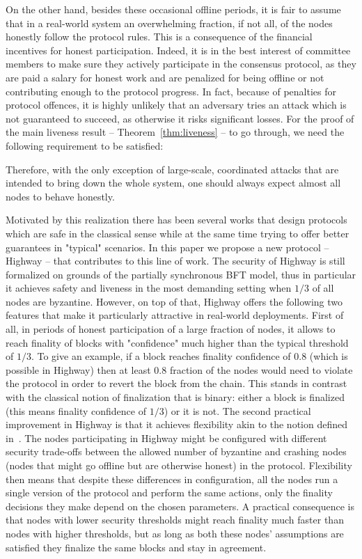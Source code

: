 \documentclass[12pt, fleqn]{article}
\begin{document}
On the other hand, besides these occasional offline periods, it is fair to assume that in a real-world system an overwhelming fraction, if not all, of the nodes honestly follow the protocol rules.
%
This is a consequence of the financial incentives for honest participation.
%
Indeed, it is in the best interest of committee members to make sure they actively participate in the consensus protocol, as they are paid a salary for honest work and are penalized for being offline or not contributing enough to the protocol progress.
%
In fact, because of penalties for protocol offences, it is highly unlikely that an adversary tries an attack which is not guaranteed to succeed, as otherwise it risks significant losses.
For the proof of the main liveness result -- Theorem~\ref{thm:liveness} -- to go through, we need the following requirement to be satisfied: 

%
Therefore, with the only exception of large-scale, coordinated attacks that are intended to bring down the whole system, one should always expect almost all nodes to behave honestly.

Motivated by this realization there has been several works that design protocols which are safe in the classical sense while at the same time trying to offer better guarantees in "typical" scenarios.
%
In this paper we propose a new protocol -- Highway -- that contributes to this line of work.
%
The security of Highway is still formalized on grounds of the partially synchronous BFT model, thus in particular it achieves safety and liveness in the most demanding setting when $1/3$ of all nodes are byzantine.
%
However, on top of that, Highway offers the following two features that make it particularly attractive in real-world deployments.
%
First of all, in periods of honest participation of a large fraction of nodes, it allows to reach finality of blocks with "confidence" much higher than the typical threshold of $1/3$.
To give an example, if a block reaches finality confidence of $0.8$ (which is possible in Highway) then at least $0.8$ fraction of the nodes would need to violate the protocol in order to revert the block from the chain.
%
This stands in contrast with the classical notion of finalization that is binary: either a block is finalized (this means finality confidence of $1/3$) or it is not.
%
The second practical improvement in Highway is that it achieves flexibility akin to the notion defined in~\cite{MNR19}.
%
The nodes participating in Highway might be configured with different security trade-offs between the allowed number of byzantine and crashing nodes (nodes that might go offline but are otherwise honest) in the protocol.
%
Flexibility then means that despite these differences in configuration, all the nodes run a single version of the protocol and perform the same actions, only the finality decisions they make depend on the chosen parameters.
%
A practical consequence is that nodes with lower security thresholds might reach finality much faster than nodes with higher thresholds, but as long as both these nodes' assumptions are satisfied they finalize the same blocks and stay in agreement.
    
\end{document}
